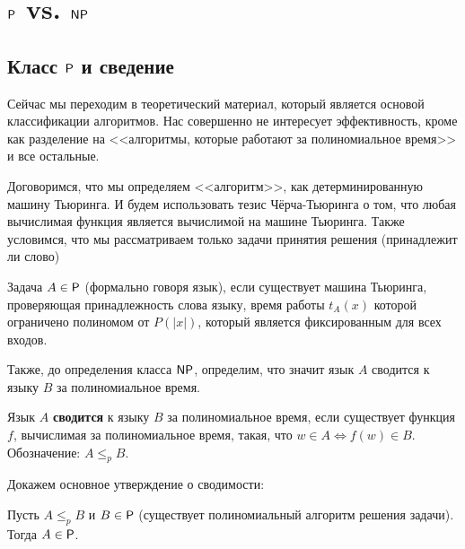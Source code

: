 \documentclass[a4paper, 12pt]{article}
\begin{document}
\pagestyle{fancy}

\section{$\mathsf{P}$ vs. $\mathsf{NP}$}

\subsection{Класс $\mathsf{P}$ и сведение}

Сейчас мы переходим в теоретический материал, который является основой
классификации алгоритмов. Нас совершенно не интересует эффективность, кроме
как разделение на <<алгоритмы, которые работают за полиномиальное время>> и все
остальные.

Договоримся, что мы определяем <<алгоритм>>, как детерминированную
машину Тьюринга. И будем
использовать тезис Чёрча-Тьюринга о том, что любая вычислимая функция является
вычислимой на машине Тьюринга. Также условимся, что мы рассматриваем только
задачи принятия решения (принадлежит ли слово)

\begin{Def}
  Задача $A \in \mathsf{P}$ (формально говоря язык), если существует машина Тьюринга,
  проверяющая принадлежность
  слова языку,
  время работы $t_A(x)$ которой ограничено полиномом от $P(|x|)$, который является
  фиксированным для всех входов.
\end{Def}

Также, до определения класса $\mathsf{NP}$, определим,
что значит язык $A$ сводится к языку $B$ за полиномиальное время.

\begin{Def}
    Язык $A$ \textbf{сводится} к языку $B$ за полиномиальное время, если 
    существует функция $f$, вычислимая за полиномиальное время, такая, что 
    $w \in A \Longleftrightarrow f(w) \in B$.
    Обозначение: $A \leqslant_p B$.
\end{Def}
Докажем основное утверждение о сводимости:
\begin{Statement}
    Пусть $A \leqslant_p B$ и $B \in \mathsf{P}$ (существует полиномиальный 
    алгоритм решения задачи). Тогда $A \in \mathsf{P}$.
\end{Statement}
\end{document}

